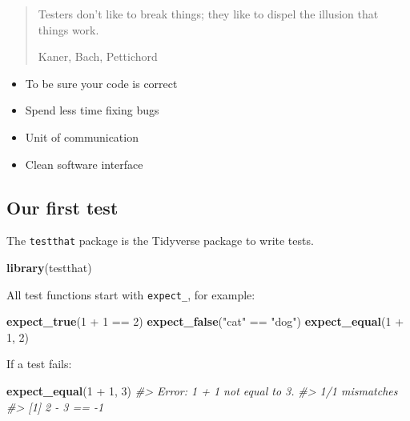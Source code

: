 \documentclass[]{book}
\newenvironment{Shaded}{}{}
\newcommand{\CommentTok}[1]{\textcolor[rgb]{0.38,0.63,0.69}{\textit{#1}}}
\newcommand{\DecValTok}[1]{\textcolor[rgb]{0.25,0.63,0.44}{#1}}
\newcommand{\KeywordTok}[1]{\textcolor[rgb]{0.00,0.44,0.13}{\textbf{#1}}}
\newcommand{\NormalTok}[1]{#1}
\newcommand{\OperatorTok}[1]{\textcolor[rgb]{0.40,0.40,0.40}{#1}}
\newcommand{\StringTok}[1]{\textcolor[rgb]{0.25,0.44,0.63}{#1}}
\providecommand{\tightlist}{%
  \setlength{\itemsep}{0pt}\setlength{\parskip}{0pt}}
\begin{document}
\begin{quote}
Testers don't like to break things;
they like to dispel the illusion that things work.

Kaner, Bach, Pettichord
\end{quote}

\begin{itemize}
\tightlist
\item
  To be sure your code is correct
\item
  Spend less time fixing bugs
\item
  Unit of communication
\item
  Clean software interface
\end{itemize}

\hypertarget{our-first-test}{%
\subsection{Our first test}\label{our-first-test}}

The \texttt{testthat} package is the Tidyverse package to write tests.

\begin{Shaded}
\begin{Highlighting}[]
\KeywordTok{library}\NormalTok{(testthat)}
\end{Highlighting}
\end{Shaded}

All test functions start with \texttt{expect\_}, for example:

\begin{Shaded}
\begin{Highlighting}[]
\KeywordTok{expect_true}\NormalTok{(}\DecValTok{1} \OperatorTok{+}\StringTok{ }\DecValTok{1} \OperatorTok{==}\StringTok{ }\DecValTok{2}\NormalTok{)}
\KeywordTok{expect_false}\NormalTok{(}\StringTok{"cat"} \OperatorTok{==}\StringTok{ "dog"}\NormalTok{)}
\KeywordTok{expect_equal}\NormalTok{(}\DecValTok{1} \OperatorTok{+}\StringTok{ }\DecValTok{1}\NormalTok{, }\DecValTok{2}\NormalTok{)}
\end{Highlighting}
\end{Shaded}

If a test fails:

\begin{Shaded}
\begin{Highlighting}[]
\KeywordTok{expect_equal}\NormalTok{(}\DecValTok{1} \OperatorTok{+}\StringTok{ }\DecValTok{1}\NormalTok{, }\DecValTok{3}\NormalTok{)}
\CommentTok{#> Error: 1 + 1 not equal to 3.}
\CommentTok{#> 1/1 mismatches}
\CommentTok{#> [1] 2 - 3 == -1}
\end{Highlighting}
\end{Shaded}
\end{document}
